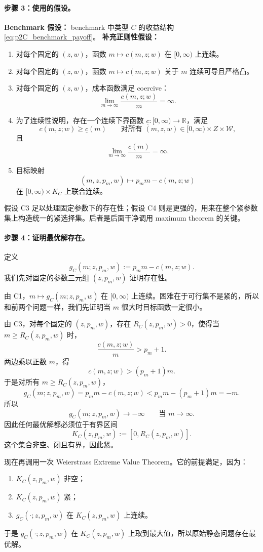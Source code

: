 \paragraph{步骤 3：使用的假设。}
\textbf{Benchmark 假设：} benchmark 中类型 $C$ 的收益结构 \eqref{eq:p2C_benchmark_payoff}。  
\textbf{补充正则性假设：}
\begin{enumerate}
    \item[(C1)] 对每个固定的 $(z,w)$，函数 $m\mapsto c(m,z;w)$ 在 $[0,\infty)$ 上连续。
    \item[(C2)] 对每个固定的 $(z,w)$，函数 $m\mapsto c(m,z;w)$ 关于 $m$ 连续可导且严格凸。
    \item[(C3)] 对每个固定的 $(z,w)$，成本函数满足 coercive：
    \[
    \lim_{m\to\infty}\frac{c(m,z;w)}{m}=\infty.
    \]
    \item[(C4)] 为了连续性说明，存在一个连续下界函数 $\underline c:[0,\infty)\to\mathbb R$，满足
    \[
    c(m,z;w)\ge \underline c(m)
    \qquad\text{对所有 }(m,z,w)\in[0,\infty)\times Z\times\mathcal W,
    \]
    且
    \[
    \lim_{m\to\infty}\frac{\underline c(m)}{m}=\infty.
    \]
    \item[(C5)] 目标映射
    \[
    (m,z,p_m,w)\mapsto p_m m-c(m,z;w)
    \]
    在 $[0,\infty)\times K_C$ 上联合连续。
\end{enumerate}

假设 C3 足以处理固定参数下的存在性；假设 C4 则是更强的，用来在整个紧参数集上构造统一的紧选择集。后者是后面干净调用 maximum theorem 的关键。

\paragraph{步骤 4：证明最优解存在。}
定义
\[
g_C(m;z,p_m,w):=p_m m-c(m,z;w).
\]
我们先对固定的参数三元组 $(z,p_m,w)$ 证明存在性。

由 C1，$m\mapsto g_C(m;z,p_m,w)$ 在 $[0,\infty)$ 上连续。困难在于可行集不是紧的，所以和前两个问题一样，我们先证明当 $m$ 很大时目标函数一定很小。

由 C3，对每个固定的 $(z,p_m,w)$，存在 $R_C(z,p_m,w)>0$，使得当 $m\ge R_C(z,p_m,w)$ 时，
\[
\frac{c(m,z;w)}{m}>p_m+1.
\]
两边乘以正数 $m$，得
\[
c(m,z;w)>(p_m+1)m.
\]
于是对所有 $m\ge R_C(z,p_m,w)$，
\[
g_C(m;z,p_m,w)=p_m m-c(m,z;w)<p_m m-(p_m+1)m=-m.
\]
所以
\[
g_C(m;z,p_m,w)\to -\infty
\qquad\text{当 }m\to\infty.
\]
因此任何最优解都必须位于有界区间
\[
K_C(z,p_m,w):=[0,R_C(z,p_m,w)].
\]
这个集合非空、闭且有界，因此紧。

现在再调用一次 Weierstrass Extreme Value Theorem。它的前提满足，因为：
\begin{enumerate}
    \item $K_C(z,p_m,w)$ 非空；
    \item $K_C(z,p_m,w)$ 紧；
    \item $g_C(\cdot;z,p_m,w)$ 在 $K_C(z,p_m,w)$ 上连续。
\end{enumerate}
于是 $g_C(\cdot;z,p_m,w)$ 在 $K_C(z,p_m,w)$ 上取到最大值，所以原始静态问题存在最优解。

